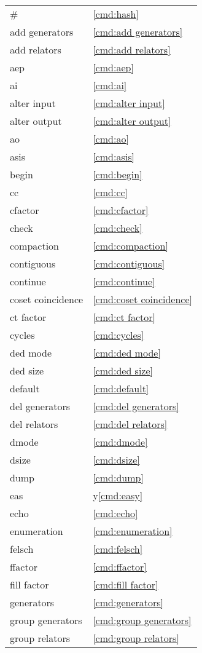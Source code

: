 {\small
\begin{minipage}[b]{6cm}
\begin{tabular}{ll}
\#&\ref{cmd:hash}\\
add generators&\ref{cmd:add generators}\\
add relators&\ref{cmd:add relators}\\
aep&\ref{cmd:aep}\\
ai&\ref{cmd:ai}\\
alter input&\ref{cmd:alter input}\\
alter output&\ref{cmd:alter output}\\
ao&\ref{cmd:ao}\\
asis&\ref{cmd:asis}\\
begin&\ref{cmd:begin}\\
cc&\ref{cmd:cc}\\
cfactor&\ref{cmd:cfactor}\\
check&\ref{cmd:check}\\
compaction&\ref{cmd:compaction}\\
contiguous&\ref{cmd:contiguous}\\
continue&\ref{cmd:continue}\\
coset coincidence\quad&\ref{cmd:coset coincidence}\\
ct factor&\ref{cmd:ct factor}\\
cycles&\ref{cmd:cycles}\\
ded mode&\ref{cmd:ded mode}\\
ded size&\ref{cmd:ded size}\\
default&\ref{cmd:default}\\
del generators&\ref{cmd:del generators}\\
del relators&\ref{cmd:del relators}\\
dmode&\ref{cmd:dmode}\\
dsize&\ref{cmd:dsize}\\
dump&\ref{cmd:dump}\\
eas&y\ref{cmd:easy}\\
echo&\ref{cmd:echo}\\
enumeration&\ref{cmd:enumeration}\\
felsch&\ref{cmd:felsch}\\
ffactor&\ref{cmd:ffactor}\\
fill factor&\ref{cmd:fill factor}\\
generators&\ref{cmd:generators}\\
group generators&\ref{cmd:group generators}\\
group relators&\ref{cmd:group relators}\\

\end{tabular}
\end{minipage}}
